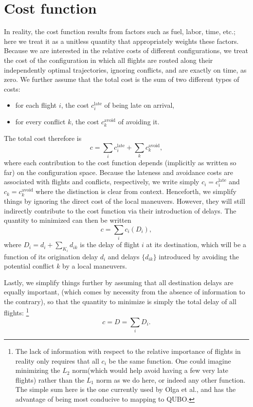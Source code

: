 \documentclass{article}
\begin{document}
\section{Cost function}
In reality, the cost function results from factors such as fuel, labor, time, etc.; here we treat it as a unitless quantity that appropriately weights these factors.
Because we are interested in the relative costs of different configurations, we treat the cost of the configuration in which all flights are routed along their independently optimal trajectories, ignoring conflicts, and are exactly on time, as zero.
We further assume that the total cost is the sum of two different types of costs:
\begin{itemize}
  \item for each flight $i$, the cost $c_i^{\mathrm{late}}$ of being late on arrival,
  \item for every conflict $k$, the cost $c_k^{\mathrm{avoid}}$ of avoiding it.
\end{itemize}
The total cost therefore is 
\begin{equation*}
c = 
\sum_i c^{\mathrm{late}}_i + 
\sum_{k} c^{\mathrm{avoid}}_k
,
\end{equation*}
where each contribution to the cost function depends (implicitly as written so far) on the configuration space.
Because the lateness and avoidance costs are associated with flights and conflicts, respectively, we write simply $c_i = c_i^{\mathrm{late}}$ and $c_{k} = c_{k}^{\mathrm{avoid}}$ where the distinction is clear from context.
Henceforth, we simplify things by ignoring the direct cost of the local maneuvers. 
However, they will still indirectly contribute to the cost function via their introduction of delays.
The quantity to minimized can then be written
\begin{equation*}
c = 
\sum_i c_i (D_i),
\end{equation*}
where $D_i = d_i + \sum_{K_i} d_{ik}$ is the delay of flight $i$ at its destination, which will be a function of its origination delay $d_i$ and delays $\{d_{ik}\}$ introduced by avoiding the potential conflict $k$ by a local maneuvers.

Lastly, we simplify things further by assuming that all destination delays are equally important, (which comes by necessity from the absence of information to the contrary), so that the quantity to minimize is simply the total delay of all flights:
\footnote{The lack of information with respect to the relative importance of flights in reality only requires that all $c_i$ be the same function. One could imagine minimizing the $L_2$ norm(which would help avoid having a few very late flights) rather than the $L_1$ norm as we do here, or indeed any other function. The simple sum here is the one currently used by Olga et al., and has the advantage of being most conducive to mapping to QUBO.}
\begin{equation} \label{eqn:total_delay}
c = D = \sum_i D_i.
\end{equation}
\end{document}
